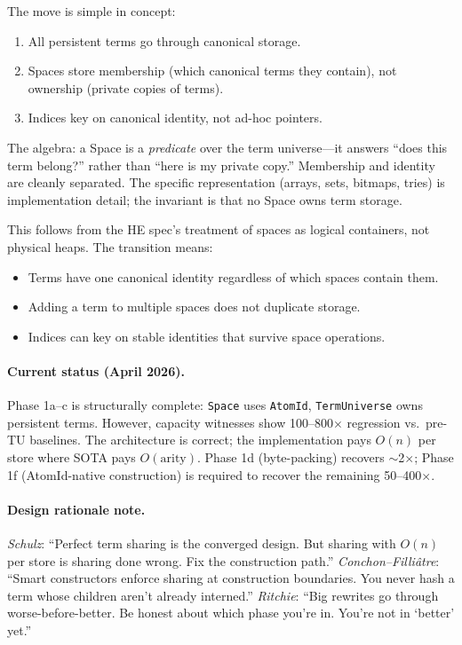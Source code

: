 \documentclass[11pt]{article}
\newcommand{\code}[1]{\texttt{#1}}
\begin{document}
The move is simple in concept:
\begin{enumerate}
\item All persistent terms go through canonical storage.
\item Spaces store membership (which canonical terms they contain),
  not ownership (private copies of terms).
\item Indices key on canonical identity, not ad-hoc pointers.
\end{enumerate}

The algebra: a Space is a \emph{predicate} over the term universe---it
answers ``does this term belong?'' rather than ``here is my private copy.''
Membership and identity are cleanly separated.  The specific representation
(arrays, sets, bitmaps, tries) is implementation detail; the invariant is
that no Space owns term storage.

This follows from the HE spec's treatment of spaces as logical containers,
not physical heaps.  The transition means:
\begin{itemize}
\item Terms have one canonical identity regardless of which spaces contain them.
\item Adding a term to multiple spaces does not duplicate storage.
\item Indices can key on stable identities that survive space operations.
\end{itemize}

\paragraph{Current status (April 2026).}
Phase 1a--c is structurally complete: \code{Space} uses \code{AtomId},
\code{TermUniverse} owns persistent terms.  However, capacity witnesses show
100--800$\times$ regression vs.\ pre-TU baselines.  The architecture is correct;
the implementation pays $O(n)$ per store where SOTA pays $O(\mathrm{arity})$.
Phase 1d (byte-packing) recovers $\sim$2$\times$; Phase 1f (AtomId-native
construction) is required to recover the remaining 50--400$\times$.

\paragraph{Design rationale note.}
\emph{Schulz}: ``Perfect term sharing is the converged design.  But sharing
with $O(n)$ per store is sharing done wrong.  Fix the construction path.''
\emph{Conchon--Filli\^{a}tre}: ``Smart constructors enforce sharing at
construction boundaries.  You never hash a term whose children aren't
already interned.''
\emph{Ritchie}: ``Big rewrites go through worse-before-better.  Be honest
about which phase you're in.  You're not in `better' yet.''
\end{document}
